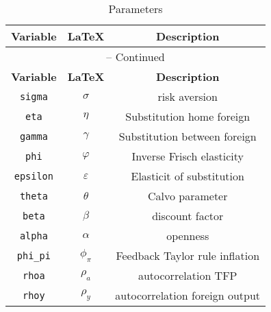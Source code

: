 \begin{center}
\begin{longtable}{ccc}
\caption{Parameters}\\%
\hline%
\multicolumn{1}{c}{\textbf{Variable}} &
\multicolumn{1}{c}{\textbf{\LaTeX}} &
\multicolumn{1}{c}{\textbf{Description}}\\%
\hline\hline%
\endfirsthead
\multicolumn{3}{c}{{\tablename} \thetable{} -- Continued}\\%
\hline%
\multicolumn{1}{c}{\textbf{Variable}} &
\multicolumn{1}{c}{\textbf{\LaTeX}} &
\multicolumn{1}{c}{\textbf{Description}}\\%
\hline\hline%
\endhead
\texttt{sigma} & $\sigma$ & risk aversion\\
\texttt{eta} & $\eta$ & Substitution home foreign\\
\texttt{gamma} & $\gamma$ & Substitution between foreign\\
\texttt{phi} & $\varphi$ & Inverse Frisch elasticity\\
\texttt{epsilon} & $\varepsilon$ & Elasticit of substitution\\
\texttt{theta} & $\theta$ & Calvo parameter\\
\texttt{beta} & $\beta$ & discount factor\\
\texttt{alpha} & $\alpha$ & openness\\
\texttt{phi\_pi} & $\phi_\pi$ & Feedback Taylor rule inflation\\
\texttt{rhoa} & $\rho_a$ & autocorrelation TFP\\
\texttt{rhoy} & $\rho_y$ & autocorrelation foreign output\\
\hline%
\end{longtable}
\end{center}
